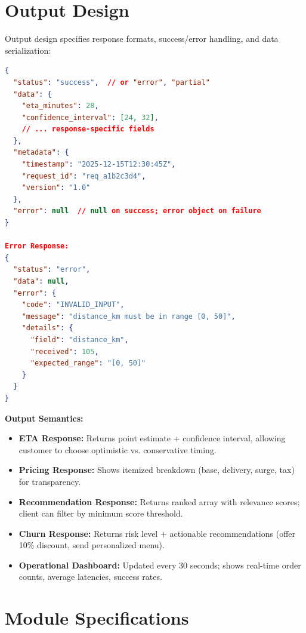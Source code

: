 \documentclass[12pt,a4paper]{report}
\begin{document}
\begin{itemize}
\section{Output Design}

Output design specifies response formats, success/error handling, and data serialization:

\begin{lstlisting}[language=json, caption={Standard API Response Format}]
{
  "status": "success",  // or "error", "partial"
  "data": {
    "eta_minutes": 28,
    "confidence_interval": [24, 32],
    // ... response-specific fields
  },
  "metadata": {
    "timestamp": "2025-12-15T12:30:45Z",
    "request_id": "req_a1b2c3d4",
    "version": "1.0"
  },
  "error": null  // null on success; error object on failure
}

Error Response:
{
  "status": "error",
  "data": null,
  "error": {
    "code": "INVALID_INPUT",
    "message": "distance_km must be in range [0, 50]",
    "details": {
      "field": "distance_km",
      "received": 105,
      "expected_range": "[0, 50]"
    }
  }
}
\end{lstlisting}

\textbf{Output Semantics:}
\begin{itemize}
    \item \textbf{ETA Response:} Returns point estimate + confidence interval, allowing customer to choose optimistic vs. conservative timing.
    \item \textbf{Pricing Response:} Shows itemized breakdown (base, delivery, surge, tax) for transparency.
    \item \textbf{Recommendation Response:} Returns ranked array with relevance scores; client can filter by minimum score threshold.
    \item \textbf{Churn Response:} Returns risk level + actionable recommendations (offer 10\% discount, send personalized menu).
    \item \textbf{Operational Dashboard:} Updated every 30 seconds; shows real-time order counts, average latencies, success rates.
\end{itemize}

\section{Module Specifications}


\end{itemize}
\end{document}
